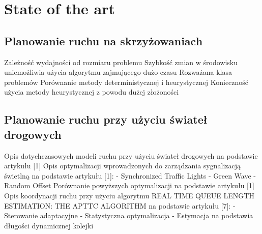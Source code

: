 \chapter{State of the art} \label{chap:state-of-the-art}

\section{Planowanie ruchu na skrzyżowaniach}

Zależność wydajności od rozmiaru problemu
\newline
\newline
Szybkość zmian w środowisku uniemożliwia użycia algorytmu zajmującego dużo czasu
\newline
\newline
Rozważana klasa problemów
\newline
\newline
Porównanie metody deterministycznej i heurystycznej
\newline
\newline
Konieczność użycia metody heurystycznej z powodu dużej złożoności

\section{Planowanie ruchu przy użyciu świateł drogowych}

Opis dotychczasowych modeli ruchu przy użyciu świateł drogowych na podstawie artykułu [1]
\newline
\newline
Opis optymalizacji wprowadzonych do zarządzania sygnalizacją świetlną na podstawie artykułu [1]:
  \newline
  - Synchronized Traffic Lights
  \newline
  - Green Wave
  \newline
  - Random Offset
  \newline
\newline
\newline
Porównanie powyższych optymalizacji na podstawie artykułu [1]
\newline
\newline
Opis koordynacji ruchu przy użyciu algorytmu REAL TIME QUEUE LENGTH ESTIMATION: THE APTTC ALGORITHM na podstawie artykułu [7]:
  \newline
  - Sterowanie adaptacyjne
  \newline
  - Statystyczna optymalizacja
  \newline
  - Estymacja na podstawia długości dynamicznej kolejki
  \newline

